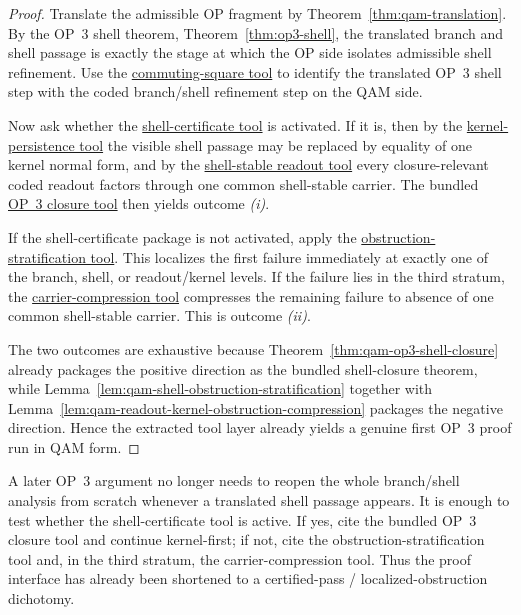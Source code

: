 \begin{proof}
Translate the admissible OP fragment by Theorem~\ref{thm:qam-translation}. By the OP~3 shell theorem, Theorem~\ref{thm:op3-shell}, the translated branch and shell passage is exactly the stage at which the OP side isolates admissible shell refinement. Use the \hyperref[tool:qam-shell-commuting-square]{commuting-square tool} to identify the translated OP~3 shell step with the coded branch/shell refinement step on the QAM side.

Now ask whether the \hyperref[tool:qam-shell-certificate]{shell-certificate tool} is activated. If it is, then by the \hyperref[tool:qam-kernel-persistence]{kernel-persistence tool} the visible shell passage may be replaced by equality of one kernel normal form, and by the \hyperref[tool:qam-shell-stable-readout]{shell-stable readout tool} every closure-relevant coded readout factors through one common shell-stable carrier. The bundled \hyperref[tool:qam-op3-shell-closure]{OP~3 closure tool} then yields outcome \emph{(i)}.

If the shell-certificate package is not activated, apply the \hyperref[tool:qam-shell-obstruction-stratification]{obstruction-stratification tool}. This localizes the first failure immediately at exactly one of the branch, shell, or readout/kernel levels. If the failure lies in the third stratum, the \hyperref[tool:qam-shell-carrier-compression]{carrier-compression tool} compresses the remaining failure to absence of one common shell-stable carrier. This is outcome \emph{(ii)}.

The two outcomes are exhaustive because Theorem~\ref{thm:qam-op3-shell-closure} already packages the positive direction as the bundled shell-closure theorem, while Lemma~\ref{lem:qam-shell-obstruction-stratification} together with Lemma~\ref{lem:qam-readout-kernel-obstruction-compression} packages the negative direction. Hence the extracted tool layer already yields a genuine first OP~3 proof run in QAM form.
\end{proof}

\begin{corollary}\label{cor:qam-op3-proof-run-use}
A later OP~3 argument no longer needs to reopen the whole branch/shell analysis from scratch whenever a translated shell passage appears. It is enough to test whether the shell-certificate tool is active. If yes, cite the bundled OP~3 closure tool and continue kernel-first; if not, cite the obstruction-stratification tool and, in the third stratum, the carrier-compression tool. Thus the proof interface has already been shortened to a certified-pass / localized-obstruction dichotomy.
\end{corollary}

